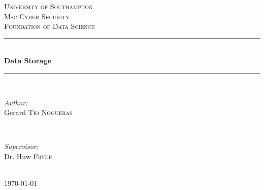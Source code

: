 \documentclass[8pt]{article}
\begin{document}

\begin{titlepage}

\newcommand{\HRule}{\rule{\linewidth}{0.5mm}}
\center
\textsc{\LARGE University of Southampton}\\[1.5cm]
\textsc{\Large Msc Cyber Security}\\[0.5cm]
\textsc{\large Foundation of Data Science}\\[0.5cm]
\HRule \\[0.4cm]
{ \huge \bfseries Data Storage}\\[0.4cm]
\HRule \\[1.5cm]

\begin{minipage}{0.4\textwidth}
\begin{flushleft} \large
\emph{Author:}\\
Gerard \textsc{Tio Nogueras}
\end{flushleft}
\end{minipage}
~
\begin{minipage}{0.4\textwidth}
\begin{flushright} \large
\emph{Supervisor:} \\
Dr. Huw \textsc{Fryer}
\end{flushright}
\end{minipage}\\[4cm]

{\large \today}\\[3cm]

\vfill
\end{titlepage}
\end{document}
